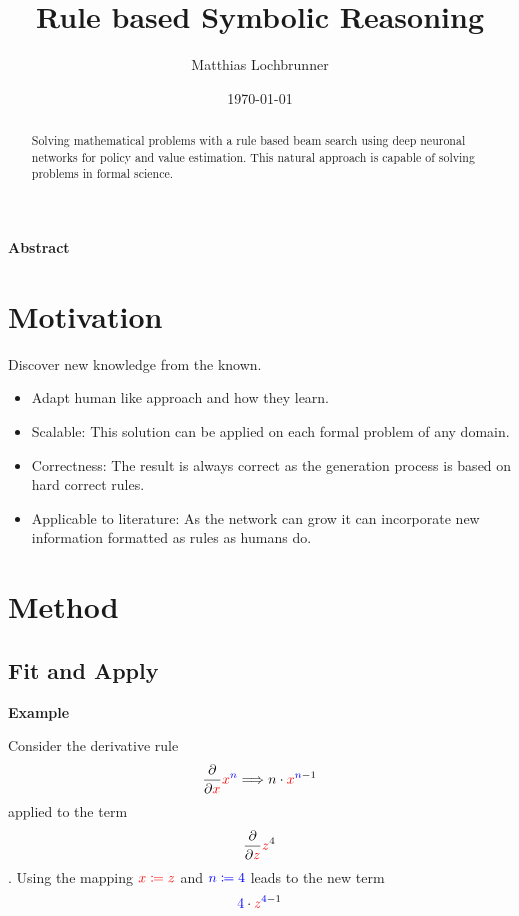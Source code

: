 \documentclass{scrartcl}
\title{Rule based Symbolic Reasoning}
\author{Matthias Lochbrunner}
\date{\today}
\begin{document}
\maketitle
\begin{center}
	\textbf{Abstract}
\end{center}
\begin{abstract}
	Solving mathematical problems with a rule based beam search using deep neuronal networks for policy and value estimation.
	This natural approach is capable of solving problems in formal science. 
\end{abstract}

\section{Motivation}
Discover new knowledge from the known.  
\begin{itemize}
	\item Adapt human like approach and how they learn.
	\item Scalable: This solution can be applied on each formal problem of any domain.
	\item Correctness: The result is always correct as the generation process is based on hard correct rules.
	\item Applicable to literature: As the network can grow it can incorporate new information formatted as rules as humans do. 
\end{itemize}

\section{Method}

\subsection{Fit and Apply}

\textbf{Example}

Consider the derivative rule
\begin{align}
	\frac{\partial}{\partial {\color{red}x}} {\color{red}x}^{\color{blue}n} \Longrightarrow n\cdot {\color{red}x}^{{\color{blue}n}-1} 
\end{align}
applied to the term
\begin{align}
	\frac{\partial}{\partial {\color{red}z}} {\color{red}z}^4 
\end{align}.
Using the mapping ${\color{red}x \coloneqq z}$ and ${\color{blue}n \coloneqq {\color{blue}4}}$ leads to the new term
\begin{align}
	{\color{blue}4}\cdot {\color{red}z}^{{\color{blue}4}-1} 
\end{align}
\end{document}
